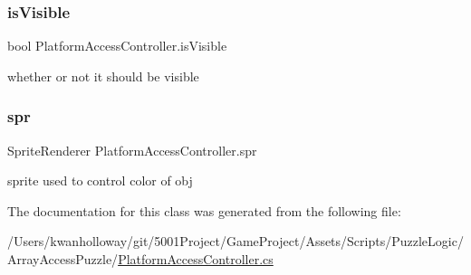 \mbox{\label{class_platform_access_controller_ae61d142d689e9436ffcdd42ae258b74b}} 
\subsubsection{\texorpdfstring{is\+Visible}{isVisible}}
{\footnotesize\ttfamily bool Platform\+Access\+Controller.\+is\+Visible}



whether or not it should be visible 

\mbox{\label{class_platform_access_controller_a148223f08e156ce2c3cbf9b87feb83d2}} 
\subsubsection{\texorpdfstring{spr}{spr}}
{\footnotesize\ttfamily Sprite\+Renderer Platform\+Access\+Controller.\+spr}



sprite used to control color of obj 



The documentation for this class was generated from the following file\+:\begin{DoxyCompactItemize}
\item 
/\+Users/kwanholloway/git/5001\+Project/\+Game\+Project/\+Assets/\+Scripts/\+Puzzle\+Logic/\+Array\+Access\+Puzzle/\hyperlink{_platform_access_controller_8cs}{Platform\+Access\+Controller.\+cs}\end{DoxyCompactItemize}
